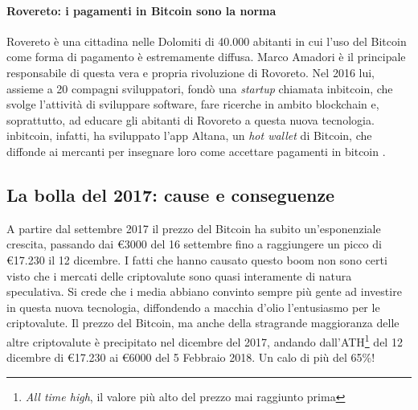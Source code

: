 \documentclass {article}
\begin{document}
\paragraph {Rovereto: i pagamenti in Bitcoin sono la norma}

Rovereto è una cittadina nelle Dolomiti di 40.000 abitanti in cui l'uso del Bitcoin come forma di pagamento è estremamente diffusa.
Marco Amadori è il principale responsabile di questa vera e propria rivoluzione di Rovoreto.
Nel 2016 lui, assieme a 20 compagni sviluppatori, fondò una \textit{startup} chiamata inbitcoin, che svolge l'attività di sviluppare software, fare ricerche in ambito blockchain e, soprattutto, ad educare gli abitanti di Rovoreto a questa nuova tecnologia.
inbitcoin, infatti, ha sviluppato l'app Altana, un \textit{hot wallet} di Bitcoin, che diffonde ai mercanti per insegnare loro come accettare pagamenti in bitcoin \cite{rovereto}.


\subsection {La bolla del 2017: cause e conseguenze}


A partire dal settembre 2017 il prezzo del Bitcoin ha subito un'esponenziale crescita, passando dai \euro{3000} del 16 settembre fino a raggiungere un picco di \euro{17.230} il 12 dicembre.
I fatti che hanno causato questo boom non sono certi visto che i mercati delle criptovalute sono quasi interamente di natura speculativa.
Si crede che i media abbiano convinto sempre più gente ad investire in questa nuova tecnologia, diffondendo a macchia d'olio l'entusiasmo per le criptovalute.
Il prezzo del Bitcoin, ma anche della stragrande maggioranza delle altre criptovalute è precipitato nel dicembre del 2017, andando dall'ATH\footnote{\textit{All time high}, il valore più alto del prezzo mai raggiunto prima} del 12 dicembre di \euro{17.230} ai \euro{6000} del 5 Febbraio 2018. Un calo di più del 65\%!
\end{document}
